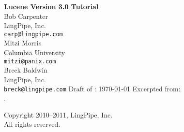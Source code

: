 \documentclass[10pt]{book}
\begin{document}
\frontmatter
\pagestyle{empty}
\vspace*{1in}
\noindent
{\Huge\bf Lucene Version 3.0 Tutorial}
\\[1in]
{\LARGE Bob Carpenter} 
\\[4pt] LingPipe, Inc.
\\[4pt] {\tt carp@lingpipe.com}
\\[16pt]
{\LARGE Mitzi Morris} 
\\[4pt] Columbia University
\\[4pt] {\tt mitzi@panix.com} 
\\[16pt]
{\LARGE Breck Baldwin} 
\\[4pt] LingPipe, Inc.
\\[4pt] {\tt breck@lingpipe.com} 
\hspace*{1in}
\vfill
{ }
\vfill
\noindent
Draft of : \today
\vfill
\noindent
Excerpted from:
\\[12pt]
\hspace*{-2pt}{\Large\it Text Processing with Java 6}.
\\[4pt]
%
\pagestyle{empty}
\clearpage
\hspace*{12pt}
\vfill
\begin{center}
{\small
Copyright 2010--2011, LingPipe, Inc.
\\
All rights reserved.}
\end{center}
\vfill
{}
\vfill
\pagestyle{empty}
\clearpage
\mainmatter
\pagestyle{fancy}

\end{document}

